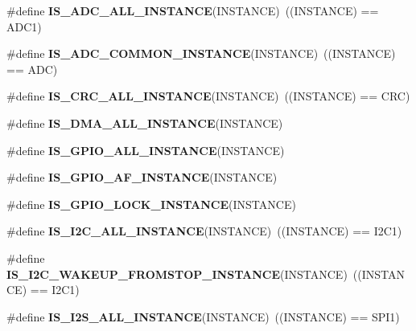 \begin{DoxyCompactItemize}
\item 
\mbox{\label{group___exported__macro_ga2204b62b378bcf08b3b9006c184c7c23}} 
\#define {\bfseries I\+S\+\_\+\+A\+D\+C\+\_\+\+A\+L\+L\+\_\+\+I\+N\+S\+T\+A\+N\+CE}(I\+N\+S\+T\+A\+N\+CE)~((I\+N\+S\+T\+A\+N\+CE) == A\+D\+C1)
\item 
\mbox{\label{group___exported__macro_gad8a5831c786b6b265531b890a194cbe2}} 
\#define {\bfseries I\+S\+\_\+\+A\+D\+C\+\_\+\+C\+O\+M\+M\+O\+N\+\_\+\+I\+N\+S\+T\+A\+N\+CE}(I\+N\+S\+T\+A\+N\+CE)~((I\+N\+S\+T\+A\+N\+CE) == A\+DC)
\item 
\mbox{\label{group___exported__macro_gaa514941a7f02f65eb27450c05e4e8dd1}} 
\#define {\bfseries I\+S\+\_\+\+C\+R\+C\+\_\+\+A\+L\+L\+\_\+\+I\+N\+S\+T\+A\+N\+CE}(I\+N\+S\+T\+A\+N\+CE)~((I\+N\+S\+T\+A\+N\+CE) == C\+RC)
\item 
\#define {\bfseries I\+S\+\_\+\+D\+M\+A\+\_\+\+A\+L\+L\+\_\+\+I\+N\+S\+T\+A\+N\+CE}(I\+N\+S\+T\+A\+N\+CE)
\item 
\#define {\bfseries I\+S\+\_\+\+G\+P\+I\+O\+\_\+\+A\+L\+L\+\_\+\+I\+N\+S\+T\+A\+N\+CE}(I\+N\+S\+T\+A\+N\+CE)
\item 
\#define {\bfseries I\+S\+\_\+\+G\+P\+I\+O\+\_\+\+A\+F\+\_\+\+I\+N\+S\+T\+A\+N\+CE}(I\+N\+S\+T\+A\+N\+CE)
\item 
\#define {\bfseries I\+S\+\_\+\+G\+P\+I\+O\+\_\+\+L\+O\+C\+K\+\_\+\+I\+N\+S\+T\+A\+N\+CE}(I\+N\+S\+T\+A\+N\+CE)
\item 
\mbox{\label{group___exported__macro_gacdf0149a4e8c41a6814c13613c38a6b2}} 
\#define {\bfseries I\+S\+\_\+\+I2\+C\+\_\+\+A\+L\+L\+\_\+\+I\+N\+S\+T\+A\+N\+CE}(I\+N\+S\+T\+A\+N\+CE)~((I\+N\+S\+T\+A\+N\+CE) == I2\+C1)
\item 
\mbox{\label{group___exported__macro_gadf692bda16bac3264bccff7f59ddaab9}} 
\#define {\bfseries I\+S\+\_\+\+I2\+C\+\_\+\+W\+A\+K\+E\+U\+P\+\_\+\+F\+R\+O\+M\+S\+T\+O\+P\+\_\+\+I\+N\+S\+T\+A\+N\+CE}(I\+N\+S\+T\+A\+N\+CE)~((I\+N\+S\+T\+A\+N\+CE) == I2\+C1)
\item 
\mbox{\label{group___exported__macro_ga0b35685911e3c7a38ee89e5cdc5a82fa}} 
\#define {\bfseries I\+S\+\_\+\+I2\+S\+\_\+\+A\+L\+L\+\_\+\+I\+N\+S\+T\+A\+N\+CE}(I\+N\+S\+T\+A\+N\+CE)~((I\+N\+S\+T\+A\+N\+CE) == S\+P\+I1)

\end{DoxyCompactItemize}
